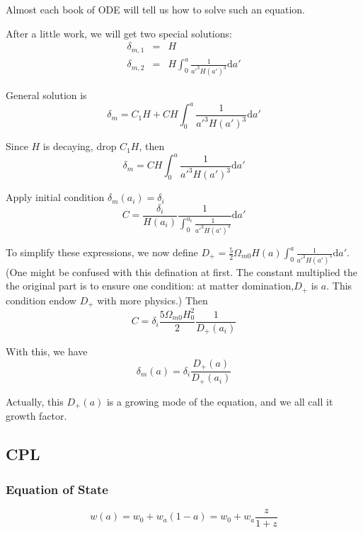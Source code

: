 Almost each book of ODE will tell us how to solve such an equation.

After a little work, we will get two special solutions:
\begin{eqnarray}
\delta_{m,1}&=&H \\
\delta_{m,2}&=&H\int^a_0 \frac1{a'^3H(a')^3}\mathrm d a'
\end{eqnarray}

General solution is
\begin{equation}
\delta_m=C_1 H+C H\int^a_0 \frac{1}{a'^3H(a')^3}\mathrm da'
\end{equation}

Since $H$ is decaying, drop $C_1 H$, then
\begin{equation}
\delta_m=C H\int^a_0 \frac{1}{a'^3H(a')^3}\mathrm da'
\end{equation}

Apply initial condition $\delta_m(a_{i})=\delta_{i}$
\begin{equation}
C=\frac{\delta_i}{H(a_i)}\frac{1}{\int^{a_i}_0\frac{1}{a'^3H(a')^3}}\mathrm d a'
\end{equation}

To simplify these expressions, we now define $D_+=\frac 5 2 \Omega_{m0} H(a) \int^a_0\frac{1}{a'^3H(a')^3}\mathrm d a'$. (One might be confused with this defination at first. The constant multiplied the the original part is to ensure one condition: at matter domination,$D_+$ is $a$. This condition endow $D_+$ with more physics.) Then 
\begin{equation}
C=\delta_i \frac {5\Omega_{m0}H_0^2}{2} \frac1{D_+(a_i)}
\end{equation}

With this, we have
\begin{equation}
\delta_m(a)=\delta_i \frac{D_+(a)}{D_+(a_i)}
\end{equation}

Actually, this $D_+(a)$ is a growing mode of the equation, and we all call it growth factor.




\subsection{CPL}

\subsubsection{Equation of State}

\begin{equation}
w(a)=w_0+w_a(1-a)=w_0+w_a\frac{z}{1+z}
\end{equation}


